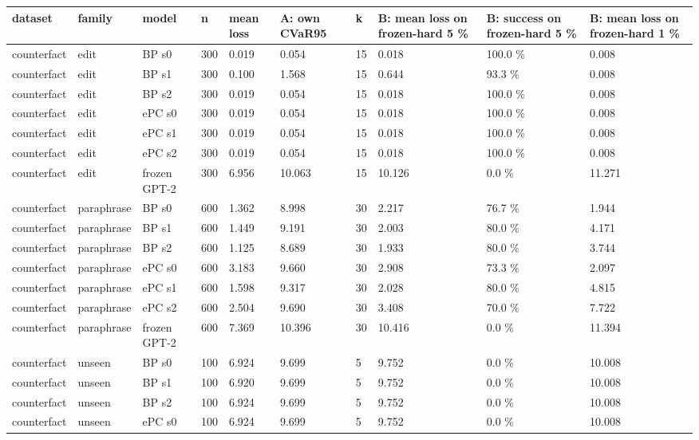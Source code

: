 \documentclass[10pt,a4paper]{article}
\begin{document}
\begin{center}\tiny
\begin{tabularx}{\textwidth}{@{}p{}XXXXXXXXX@{}}
\toprule
dataset & family & model & n & mean loss & A: own CVaR95 & k & B: mean loss on frozen-hard 5 \% & B: success on frozen-hard 5 \% & B: mean loss on frozen-hard 1 \% \\ \midrule
counterfact & edit & BP s0 & 300 & 0.019 & 0.054 & 15 & 0.018 & 100.0 \% & 0.008 \\
counterfact & edit & BP s1 & 300 & 0.100 & 1.568 & 15 & 0.644 & 93.3 \% & 0.008 \\
counterfact & edit & BP s2 & 300 & 0.019 & 0.054 & 15 & 0.018 & 100.0 \% & 0.008 \\
counterfact & edit & ePC s0 & 300 & 0.019 & 0.054 & 15 & 0.018 & 100.0 \% & 0.008 \\
counterfact & edit & ePC s1 & 300 & 0.019 & 0.054 & 15 & 0.018 & 100.0 \% & 0.008 \\
counterfact & edit & ePC s2 & 300 & 0.019 & 0.054 & 15 & 0.018 & 100.0 \% & 0.008 \\
counterfact & edit & frozen GPT-2 & 300 & 6.956 & 10.063 & 15 & 10.126 & 0.0 \% & 11.271 \\
counterfact & paraphrase & BP s0 & 600 & 1.362 & 8.998 & 30 & 2.217 & 76.7 \% & 1.944 \\
counterfact & paraphrase & BP s1 & 600 & 1.449 & 9.191 & 30 & 2.003 & 80.0 \% & 4.171 \\
counterfact & paraphrase & BP s2 & 600 & 1.125 & 8.689 & 30 & 1.933 & 80.0 \% & 3.744 \\
counterfact & paraphrase & ePC s0 & 600 & 3.183 & 9.660 & 30 & 2.908 & 73.3 \% & 2.097 \\
counterfact & paraphrase & ePC s1 & 600 & 1.598 & 9.317 & 30 & 2.028 & 80.0 \% & 4.815 \\
counterfact & paraphrase & ePC s2 & 600 & 2.504 & 9.690 & 30 & 3.408 & 70.0 \% & 7.722 \\
counterfact & paraphrase & frozen GPT-2 & 600 & 7.369 & 10.396 & 30 & 10.416 & 0.0 \% & 11.394 \\
counterfact & unseen & BP s0 & 100 & 6.924 & 9.699 & 5 & 9.752 & 0.0 \% & 10.008 \\
counterfact & unseen & BP s1 & 100 & 6.920 & 9.699 & 5 & 9.752 & 0.0 \% & 10.008 \\
counterfact & unseen & BP s2 & 100 & 6.924 & 9.699 & 5 & 9.752 & 0.0 \% & 10.008 \\
counterfact & unseen & ePC s0 & 100 & 6.924 & 9.699 & 5 & 9.752 & 0.0 \% & 10.008 \\

\end{tabularx}
\end{center}
\end{document}
